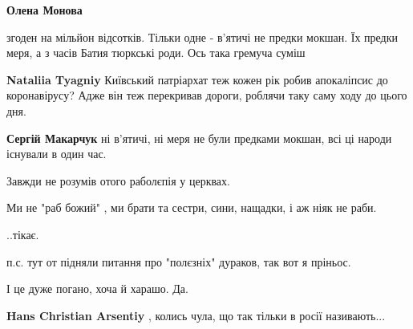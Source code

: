 \begin{itemize}
\begin{itemize}
\textbf{Олена Монова} 

згоден на мільйон відсотків. Тільки одне - в'ятичі не
предки мокшан. Їх предки меря, а з часів Батия тюркські роди. Ось така гремуча
суміш

 
\textbf{Nataliia Tyagniy} Київський патріархат теж кожен рік робив апокаліпсис до коронавірусу? Адже він теж перекривав дороги, роблячи таку саму ходу до цього дня.

 
\textbf{Сергій Макарчук} ні в'ятичі, ні меря не були предками мокшан, всі ці народи існували в один час.
\end{itemize}

 

Завжди не розумів отого раболєпія у церквах.

Ми не "раб божий" , ми брати та сестри, сини, нащадки, і аж ніяк не раби.

..тікає.

п.с. тут от підняли питання про "полєзніх" дураков, так вот я пріньос.

І це дуже погано, хоча й харашо. Да.

\begin{itemize}
 
\textbf{Hans Christian Arsentiy} , колись чула, що так тільки в росії називають...

 

\end{itemize}
\end{itemize}
